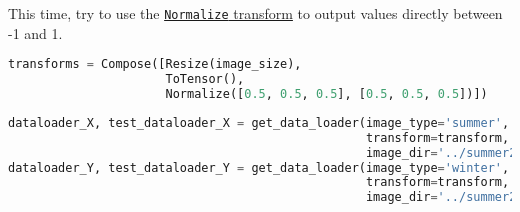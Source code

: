 This time, try to use the
\href{https://pytorch.org/vision/main/generated/torchvision.transforms.Normalize.html}{\lstinline{Normalize}
transform} to output values directly between -1 and 1.

\begin{lstlisting}[language=Python]
transforms = Compose([Resize(image_size),
                      ToTensor(),
                      Normalize([0.5, 0.5, 0.5], [0.5, 0.5, 0.5])])
\end{lstlisting}

\begin{lstlisting}[language=Python]
dataloader_X, test_dataloader_X = get_data_loader(image_type='summer', 
                                                  transform=transform,
                                                  image_dir='../summer2winter_yosemite/',)
dataloader_Y, test_dataloader_Y = get_data_loader(image_type='winter', 
                                                  transform=transform,
                                                  image_dir='../summer2winter_yosemite/',)
\end{lstlisting}
